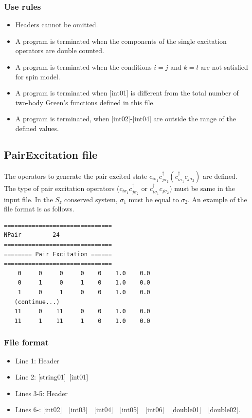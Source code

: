\subsubsection{Use rules}
\begin{itemize}
\item Headers cannot be omitted. 
\item A program is terminated when the components of the single excitation operators are double counted.
\item {A program is terminated when the conditions $i=j$ and $k=l$ are not satisfied for spin model.}
\item A program is terminated when $[$int01$]$ is different from the total number of two-body Green's functions defined in this file.
\item A program is terminated, when $[$int02$]$-$[$int04$]$ are outside the range of the defined values.
\end{itemize}

\newpage
\subsection{{PairExcitation file}}
\label{Subsec:pairexcitation}
The operators to generate the pair excited state $c_{i\sigma_1}c_{j\sigma_2}^{\dagger}(c_{i\sigma_1}^{\dagger}c_{j\sigma_2})$ are defined. The type of pair excitation operators ($c_{i\sigma_1}c_{j\sigma_2}^{\dagger}$ or $c_{i\sigma_1}^{\dagger}c_{j\sigma_2}$) must be same in the input file. In the $S_z$ conserved system, $\sigma_1$ must be equal to $\sigma_2$. An example of the file format is as follows.

\begin{minipage}{12.5cm}
\begin{screen}
\begin{verbatim}
===============================
NPair         24
===============================
======== Pair Excitation ======
===============================
    0     0     0     0    0    1.0    0.0
    0     1     0     1    0    1.0    0.0
    1     0     1     0    0    1.0    0.0
   (continue...)
   11     0    11     0    0    1.0    0.0
   11     1    11     1    0    1.0    0.0
\end{verbatim}
\end{screen}
\end{minipage}

\subsubsection{File format}
 \begin{itemize}
   \item  Line 1:  Header
   \item  Line 2:   [string01]~[int01]
   \item  Lines 3-5:  Header
   \item  Lines 6-: 
  [int02]~~[int03]~~[int04]~~[int05]~~[int06]~~[double01]~~[double02].
  \end{itemize}
